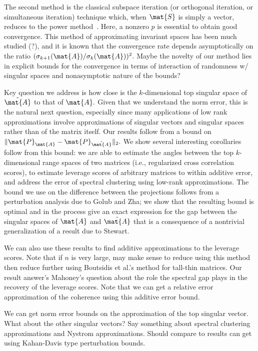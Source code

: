 The second method is the classical subspace iteration (or orthogonal iteration,
or simultaneous iteration) technique which, when $\mat{S}$ is simply a vector,
reduces to the power method~\cite{W07}. Here, a nonzero $p$ is essential to
obtain good convergence. This method of approximating invariant spaces has been
much studied (?), and it is known that the convergence rate depends
asymptotically on the ratio $(\sigma_{k+1}(\mat{A})/\sigma_k(\mat{A}))^2.$ Maybe
the novelty of our method lies in explicit bounds for the convergence in terms
of interaction of randomness w/ singular spaces and nonasymptotic nature of the
bounds? 

Key question we address is how close is the $k$-dimensional top singular space
of $\tilde{\mat{A}}$ to that of $\mat{A}.$ Given that we understand the norm
error, this is the natural next question, especially since many applications of
low rank approximations involve approximations of singular vectors and singular
spaces rather than of the matrix itself. Our results follow from a bound on
$\|\mat{P}_{\mat{A}} - \mat{P}_{\tilde{\mat{A}}}\|_2.$ We show several
interesting corollaries follow from this bound: we are able to estimate the
angles between the top $k$-dimensional range spaces of two matrices (i.e.,
regularized cross correlation scores), to estimate leverage scores of arbitrary
matrices to within additive error, and address the error of spectral clustering
using low-rank approximations. The bound we use on the difference between the
projections follows from a perturbation analysis due to Golub and Zha; we show
that the resulting bound is optimal and in the process give an exact expression
for the gap 
between the singular spaces of $\mat{A}$ and $\tilde{\mat{A}}$ that is a
consequence of a nontrivial generalization of a result due to Stewart.

We can also use these results to find additive approximations to the leverage
scores. Note that if $n$ is very large, may make sense to reduce using this
method then reduce further using Boutsidis et al.'s method for tall-thin
matrices. Our result answer's Mahoney's question about the role the spectral gap
plays in the recovery of the leverage scores. Note that we can get a relative
error approximation of the coherence using this additive error bound.

We can get norm error bounds on the approximation of the top singular vector.
What about the other singular vectors? Say something about spectral clustering
approximations and Nystrom approximations.
Should compare to results can get using Kahan-Davis type perturbation bounds.

